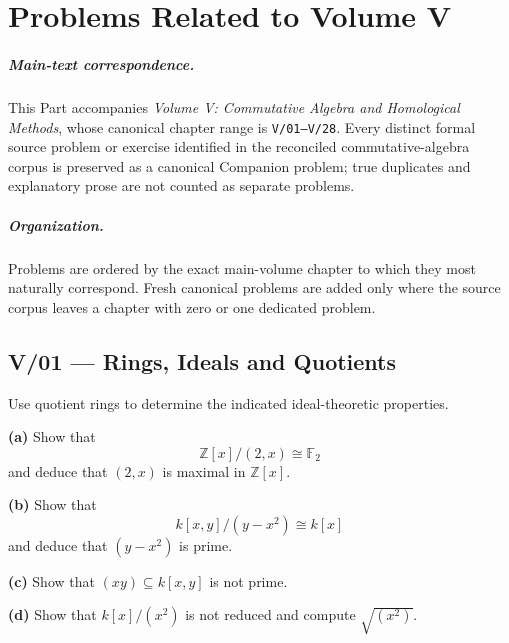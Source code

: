 \chapter{Problems Related to Volume V}
\label{ch:companion-v}

\paragraph{Main-text correspondence.}
This Part accompanies \emph{Volume V: Commutative Algebra and Homological Methods},
whose canonical chapter range is \texttt{V/01--V/28}. Every distinct formal source
problem or exercise identified in the reconciled commutative-algebra corpus is preserved
as a canonical Companion problem; true duplicates and explanatory prose are not counted
as separate problems.

\paragraph{Organization.}
Problems are ordered by the exact main-volume chapter to which they most naturally
correspond. Fresh canonical problems are added only where the source corpus leaves a
chapter with zero or one dedicated problem.


\section*{V/01 --- Rings, Ideals and Quotients}

\begin{problem}[CP-V-0005]
\label{prob:cp-v-0005}
Use quotient rings to determine the indicated ideal-theoretic properties.

\textbf{(a)} Show that
\[
\mathbb Z[x]/(2,x)\cong\mathbb F_2
\]
and deduce that \((2,x)\) is maximal in \(\mathbb Z[x]\).

\textbf{(b)} Show that
\[
k[x,y]/(y-x^2)\cong k[x]
\]
and deduce that \((y-x^2)\) is prime.

\textbf{(c)} Show that \((xy)\subseteq k[x,y]\) is not prime.

\textbf{(d)} Show that \(k[x]/(x^2)\) is not reduced and compute
\(\sqrt{(x^2)}\).
\end{problem}

